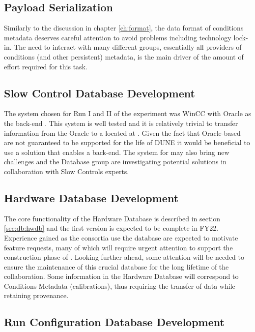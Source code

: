 \documentclass[../main-v1.tex]{subfiles}
\begin{document}
\subsection{Payload Serialization}

Similarly to the discussion in chapter \ref{ch:format}, the data format of conditions metadata deserves careful attention to avoid problems including technology lock-in.  The need to interact with many different groups, essentially all providers of conditions (and other persistent) metadata, is the main driver of the amount of effort required for this task.

\subsection{Slow Control Database Development}

The   system chosen for Run I and II of the  experiment was WinCC with Oracle as the back-end . This system is well tested and it is relatively trivial to transfer information from the Oracle  to a   located at . Given the fact that Oracle-based  are not guaranteed to be supported for the life of DUNE it would be beneficial to use a solution that enables a  back-end.  The  system for  may also bring new challenges and the Database group are investigating potential solutions in collaboration with Slow Controls experts. 


\subsection{Hardware Database Development}

The core functionality of the Hardware Database is described in section \ref{sec:db:hwdb} and the first version is expected to be complete in FY22.  Experience gained as the consortia use the database are expected to motivate feature requests, many of which will require urgent attention to support the construction phase of .  Looking further ahead, some attention will be needed to ensure the maintenance of this crucial database for the long lifetime of the collaboration.  Some information in the Hardware Database will correspond to Conditions Metadata (calibrations), thus requiring the transfer of data while retaining provenance.


\subsection{Run Configuration Database Development}
\end{document}
